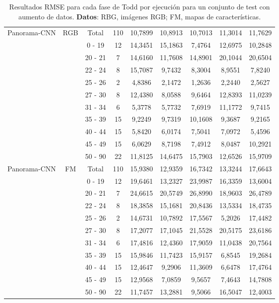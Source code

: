 \begin{table}[ht!]
{\begin{tabular}{|c|c|c|c|c|c|c|c|c|}
\multirow{11}{*}{Panorama-CNN} & \multirow{11}{*}{RGB} & Total & 110 & 10,7899 & 10,8913 & 10,7013 & 11,3014 & 11,7629 \\
 &  & 0 - 19 & 12 & 14,3451 & 15,1863 & 7,4764 & 12,6975 & 10,2848 \\
 &  & 20 - 21 & 7 & 14,6160 & 11,7608 & 14,8901 & 20,1044 & 20,6504 \\
 &  & 22 - 24 & 8 & 15,7087 & 9,7432 & 8,3004 & 8,9551 & 7,8240 \\
 &  & 25 - 26 & 2 & 4,8386 & 2,1472 & 1,2636 & 2,2440 & 2,5627 \\
 &  & 27 - 30 & 8 & 12,4380 & 8,0588 & 9,6464 & 12,8393 & 11,0239 \\
 &  & 31 - 34 & 6 & 5,3778 & 5,7732 & 7,6919 & 11,1772 & 9,7415 \\
 &  & 35 - 39 & 15 & 9,2249 & 9,7319 & 10,1608 & 9,3687 & 9,2165 \\
 &  & 40 - 44 & 15 & 5,8420 & 6,0174 & 7,5041 & 7,0972 & 5,4596 \\
 &  & 45 - 49 & 15 & 6,0629 & 8,7198 & 7,4912 & 8,0487 & 10,2921 \\
 &  & 50 - 90 & 22 & 11,8125 & 14,6475 & 15,7903 & 12,6526 & 15,9709 \\ \hline
\multirow{11}{*}{Panorama-CNN} & \multirow{11}{*}{FM} & Total & 110 & 15,9380 & 12,9359 & 16,7342 & 13,3244 & 17,6643 \\
 &  & 0 - 19 & 12 & 19,6461 & 13,2327 & 23,9987 & 16,3359 & 13,6004 \\
 &  & 20 - 21 & 7 & 24,6615 & 20,5749 & 26,8990 & 18,9603 & 26,4789 \\
 &  & 22 - 24 & 8 & 18,3858 & 15,1681 & 20,8436 & 13,5334 & 18,4735 \\
 &  & 25 - 26 & 2 & 14,6731 & 10,7892 & 17,5567 & 5,2026 & 17,4482 \\
 &  & 27 - 30 & 8 & 17,2077 & 17,1045 & 21,5528 & 20,5175 & 23,6186 \\
 &  & 31 - 34 & 6 & 17,4816 & 12,4360 & 17,9059 & 11,0438 & 20,7564 \\
 &  & 35 - 39 & 15 & 15,9846 & 11,7423 & 15,9157 & 6,8545 & 19,2684 \\
 &  & 40 - 44 & 15 & 12,4647 & 9,2906 & 11,3609 & 6,6478 & 17,4764 \\
 &  & 45 - 49 & 15 & 12,9568 & 7,0859 & 9,5657 & 7,4643 & 14,7808 \\
 &  & 50 - 90 & 22 & 11,7457 & 13,2881 & 9,5066 & 16,5047 & 12,4003 \\ \hline
\end{tabular}%
}
\caption[Resultados RMSE para cada fase de Todd por ejecución para un conjunto de test con aumento de datos.]{Resultados RMSE para cada fase de Todd por ejecución para un conjunto de test con aumento de datos. \textbf{Datos}: RBG, imágenes RGB; FM, mapas de características.}
\label{tab:rtodd_s_rmse}
\end{table}